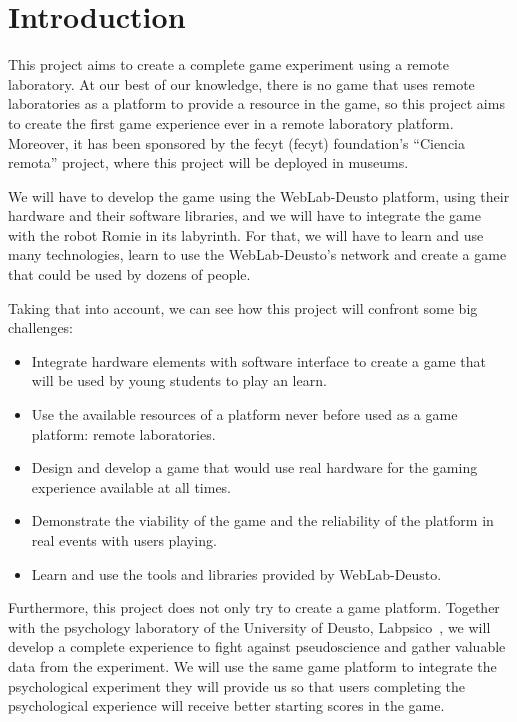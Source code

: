 \chapter{Introduction}

This project aims to create a complete game experiment using a remote laboratory. At our best of our
knowledge, there is no game that uses remote laboratories as a platform to provide a resource in the
game, so this project aims to create the first game experience ever in a remote laboratory platform.
Moreover, it has been sponsored by the \acrshort{fecyt} (\acrlong{fecyt}) foundation's ``Ciencia
remota'' project, where this project will be deployed in museums.

We will have to develop the game using the WebLab-Deusto platform, using their hardware and their
software libraries, and we will have to integrate the game with the robot Romie in its labyrinth.
For that, we will have to learn and use many technologies, learn to use the WebLab-Deusto's network
and create a game that could be used by dozens of people.

Taking that into account, we can see how this project will confront some big challenges:

\begin{itemize}

\item Integrate hardware elements with software interface to create a game that will be used by
young students to play an learn.

\item Use the available resources of a platform never before used as a game platform: remote
laboratories.

\item Design and develop a game that would use real hardware for the gaming experience available
at all times.

\item Demonstrate the viability of the game and the reliability of the platform in real events with
users playing.

\item Learn and use the tools and libraries provided by WebLab-Deusto.

\end{itemize}

Furthermore, this project does not only try to create a game platform. Together with the psychology
laboratory of the University of Deusto, Labpsico~\cite{labpsico_web}, we will develop a complete
experience to fight against pseudoscience and gather valuable data from the experiment. We will use
the same game platform to integrate the psychological experiment they will provide us so that users
completing the psychological experience will receive better starting scores in the game.

